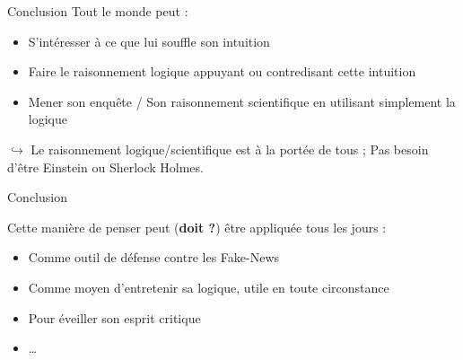 \documentclass[usenames, dvipsnames]{beamer}
\begin{document}
\begin{frame}[plain]{Conclusion}
Tout le monde peut : 
\begin{itemize}
\item S'intéresser à ce que lui souffle son intuition \pause
\item Faire le raisonnement logique appuyant ou contredisant cette intuition \pause 
\item Mener son enquête / Son raisonnement scientifique en utilisant simplement la logique
\end{itemize}
\pause $\hookrightarrow$ Le raisonnement logique/scientifique est à la portée de tous ; Pas besoin d'être Einstein ou Sherlock Holmes.
\end{frame} 




\begin{frame}[plain]{Conclusion}

Cette manière de penser peut (\textbf{doit ?}) être appliquée tous les jours \pause : 
\begin{itemize}
\item Comme outil de défense contre les Fake-News
\item Comme moyen d'entretenir sa logique, utile en toute circonstance
\item Pour éveiller son esprit critique
\item \ldots
\end{itemize}

\end{frame}
\end{document}
